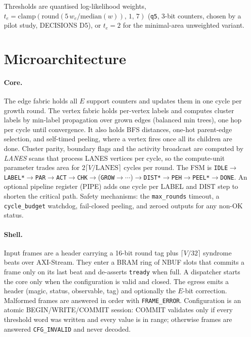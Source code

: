 \documentclass[10pt]{article}
\begin{document}
Thresholds are quantised log-likelihood weights, $t_e=\mathrm{clamp}(\mathrm{round}(5\,w_e/\mathrm{median}(w)),\,1,\,7)$
(\texttt{q5}, 3-bit counters, chosen by a pilot study, DECISIONS D5), or $t_e=2$ for the minimal-area
unweighted variant.

\section{Microarchitecture}\label{sec:uarch}
\paragraph{Core.} The edge fabric holds all $E$ support counters and updates them in one cycle per growth
round. The vertex fabric holds per-vertex labels and computes cluster labels by min-label propagation over
grown edges (balanced min trees), one hop per cycle until convergence. It also holds BFS distances, one-hot
parent-edge selection, and self-timed peeling, where a vertex fires once all its children are done. Cluster
parity, boundary flags and the activity broadcast are computed by \emph{LANES} scans that process LANES
vertices per cycle, so the compute-unit parameter trades area for $2\lceil V/\text{LANES}\rceil$ cycles per round.
The FSM is \texttt{IDLE}$\to$\texttt{LABEL*}$\to$\texttt{PAR}$\to$\texttt{ACT}$\to$\texttt{CHK}$\to$(\texttt{GROW}$\to\cdots$)$\to$\texttt{DIST*}$\to$\texttt{PEH}$\to$\texttt{PEEL*}$\to$\texttt{DONE}.
An optional pipeline register (PIPE) adds one cycle per LABEL and DIST step to shorten the critical path.
Safety mechanisms: the \texttt{max\_rounds} timeout, a \texttt{cycle\_budget} watchdog, fail-closed
peeling, and zeroed outputs for any non-OK status.

\paragraph{Shell.} Input frames are a header carrying a 16-bit round tag plus $\lceil V/32\rceil$ syndrome beats
over AXI-Stream. They enter a BRAM ring of NBUF slots that commits a frame only on its last beat and
de-asserts \texttt{tready} when full. A dispatcher starts the core only when the configuration is valid and
closed. The egress emits a header (magic, status, observable, tag) and optionally the $E$-bit correction.
Malformed frames are answered in order with \texttt{FRAME\_ERROR}. Configuration is an atomic
BEGIN/WRITE/COMMIT session: COMMIT validates only if every threshold word was written and every value is
in range; otherwise frames are answered \texttt{CFG\_INVALID} and never decoded.
\end{document}
